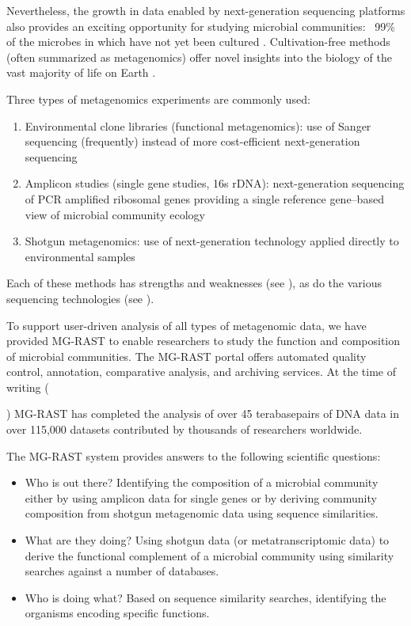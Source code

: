\documentclass[12pt,fullpage]{report}
\begin{document}
Nevertheless, the growth in data enabled by next-generation sequencing platforms also provides an exciting opportunity for studying microbial communities: ~99\% of the microbes in which have not yet been cultured \cite{MGREVIEW}. Cultivation-free methods (often summarized as metagenomics) offer novel insights into the biology of the vast majority of life on Earth \cite{THOMASREVIEW}.

Three types of metagenomics experiments are commonly used:

\begin{enumerate}

\item Environmental clone libraries (functional metagenomics):
use of Sanger sequencing (frequently) instead of more cost-efficient next-generation sequencing

\item Amplicon studies (single gene studies, \gls{16s} rDNA):
next-generation sequencing of PCR amplified ribosomal genes providing a single reference gene--based view of microbial community ecology

\item Shotgun metagenomics: 
use of next-generation technology applied directly to environmental samples
\end{enumerate}

\noindent
Each of these methods has strengths and weaknesses (see \cite{THOMASREVIEW}), as do the various sequencing technologies (see \cite{LOMAN}).

To support user-driven analysis of all types of metagenomic data, we have provided MG-RAST \cite{MG-RAST} to enable researchers to study the function and composition of microbial communities.
The MG-RAST portal offers automated quality control, annotation, comparative analysis, and archiving services.
At the time of writing (\date{\today}) MG-RAST has completed the analysis of over 45 terabasepairs of DNA data in over 115,000 datasets contributed by thousands of researchers worldwide.

The MG-RAST system provides answers to the following scientific questions:
\begin{itemize}
\item Who is out there?
Identifying the composition of a microbial community either by using amplicon data for single genes or by deriving community composition from shotgun metagenomic data using sequence similarities.

\item What are they doing?
Using shotgun data (or metatranscriptomic data) to derive the functional complement of a microbial community using similarity searches against a number of databases.

\item Who is doing what?
Based on sequence similarity searches, identifying the organisms encoding specific functions.
\end{itemize}
\end{document}
